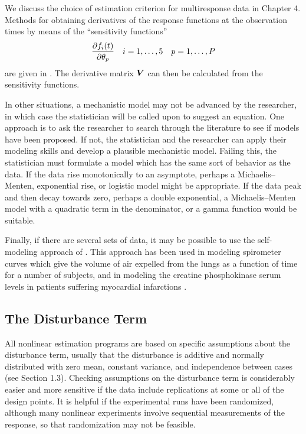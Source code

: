 \begin{example}
We discuss the choice of estimation criterion for multiresponse data
in Chapter 4.
Methods for obtaining derivatives of the response functions at
the observation times by means of the
``sensitivity functions''
      \begin{displaymath}
        {\partial f_i(t)\over\partial\theta_p}\quad
        i=1,\ldots,5\quad p = 1 ,\ldots, P 
      \end{displaymath}
are given in .
The derivative matrix ${\boldsymbol V}$ can then be calculated from the
sensitivity functions.
\end{example}

In other situations, a mechanistic model may not be advanced by
the researcher, in which case the statistician will be called
upon to suggest an equation.
One approach is to ask the researcher to search through the
literature to see if models have been proposed.
If not, the statistician and the researcher can apply their
modeling skills and develop a plausible mechanistic model.
Failing this, the statistician must formulate a model which has
the same sort of behavior as the data.
If the data rise monotonically to an asymptote, perhaps a
Michaelis--Menten, exponential rise, or logistic model might be
appropriate.
If the data peak and then decay towards zero, perhaps a
double exponential, a Michaelis--Menten model with a quadratic
term in the denominator, or a gamma function would be suitable.

Finally, if there are several sets of data, it may be possible to use
the self-modeling approach of .
This approach has been used in modeling spirometer curves
which give the volume of air expelled
from the lungs as a function of time for a number of subjects,
and in modeling the
creatine phosphokinase serum levels in patients suffering
myocardial infarctions \cite{arms:watt:hami:chio:park:1979}.

\subsection{The Disturbance Term}

All nonlinear estimation programs are based on specific
assumptions about the disturbance term, usually that the
disturbance is additive and normally distributed with zero mean,
constant variance, and independence between cases (see Section
1.3).
Checking assumptions on the disturbance term is considerably
easier and more sensitive
if the data include replications at some or all of the design
points.
It is helpful if the experimental runs have been randomized,
although many nonlinear experiments involve sequential
measurements of the response, so that randomization may not be
feasible.

